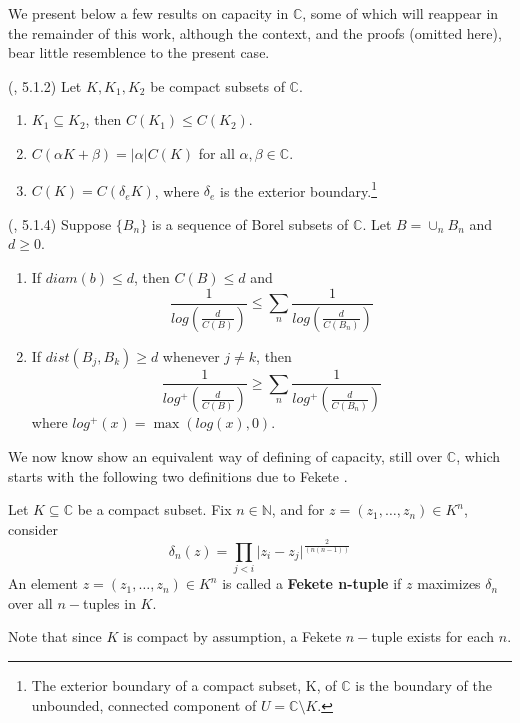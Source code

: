 We present below a few results on capacity in $\mathbb{C}$, some of which will reappear in the remainder of this work, although the context, and the proofs (omitted here), bear little resemblence to the present case.\\ 

\begin{proposition}
(\cite{rand}, 5.1.2) Let $K,  K_1,K_2$ be compact subsets of $\mathbb{C}$.
\begin{enumerate}
\item $K_1 \subseteq K_2$, then $C(K_1) \leq C(K_2)$.
\item $C(\alpha K + \beta) = \lvert \alpha \rvert C(K)$ for all $\alpha, \beta \in \mathbb{C}$.
\item $C(K) = C(\delta_eK)$, where $\delta_e$ is the exterior boundary.\footnote{The exterior boundary of a compact subset, K, of $\mathbb{C}$ is the boundary of the unbounded, connected component of $U = \mathbb{C}\setminus K$.}
\end{enumerate}
\end{proposition}

\begin{proposition}
(\cite{rand}, 5.1.4) Suppose $\{B_n\}$ is a sequence of Borel subsets of $\mathbb{C}$. Let $B=\cup_n B_n$ and $d \geq 0$. 
\begin{enumerate}
\item If $diam(b) \leq d$, then $C(B) \leq d$ and \[\frac{1}{log(\frac{d}{C(B)})} \leq \sum_n \frac{1}{log(\frac{d}{C(B_n)})}\]
\item If $dist(B_j, B_k) \geq d$ whenever $j \neq k$, then \[\frac{1}{log^+(\frac{d}{C(B)})} \geq \sum_n \frac{1}{log^+(\frac{d}{C(B_n)})}\] where $log^+(x) = \max(log(x),0)$.
\end{enumerate}
\end{proposition}



We now know show an equivalent way of  defining of capacity, still over $\mathbb{C}$, which starts with the following two definitions due to Fekete \cite{fek}.\\ 

\begin{definition}
\cite{fek} Let $K \subseteq \mathbb{C}$ be a compact subset. Fix $n \in \mathbb{N}$, and for $z = (z_1,\ldots,z_n) \in K^n$, consider
\[\delta_n(z) = \prod_{j < i} \lvert z_i - z_j \rvert^{\frac{2}{(n(n-1))}} \]
An element $z = (z_1,\ldots,z_n) \in K^n$ is called a \textbf{Fekete n-tuple} if $z$ maximizes $\delta_n$ over all $n-$tuples in $K$.
\end{definition}
Note that since $K$ is compact by assumption, a Fekete $n-$tuple exists for each $n$.\\

